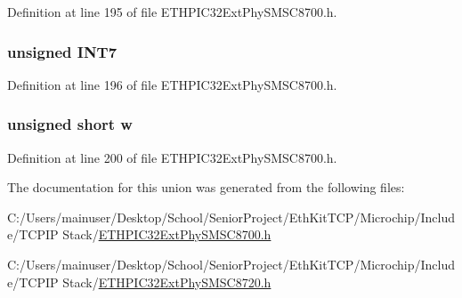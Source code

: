 Definition at line 195 of file E\+T\+H\+P\+I\+C32\+Ext\+Phy\+S\+M\+S\+C8700.\+h.

\hypertarget{union_____i_n_t_m_a_s_kbits__t_ace3cce0f8bc2d246805ad9a8c00ea02e}{}
\subsubsection[{I\+N\+T7}]{\setlength{\rightskip}{0pt plus 5cm}unsigned I\+N\+T7}\label{union_____i_n_t_m_a_s_kbits__t_ace3cce0f8bc2d246805ad9a8c00ea02e}


Definition at line 196 of file E\+T\+H\+P\+I\+C32\+Ext\+Phy\+S\+M\+S\+C8700.\+h.

\hypertarget{union_____i_n_t_m_a_s_kbits__t_a160850a4684a3e82c2323033964f2e98}{}
\subsubsection[{w}]{\setlength{\rightskip}{0pt plus 5cm}unsigned short w}\label{union_____i_n_t_m_a_s_kbits__t_a160850a4684a3e82c2323033964f2e98}


Definition at line 200 of file E\+T\+H\+P\+I\+C32\+Ext\+Phy\+S\+M\+S\+C8700.\+h.



The documentation for this union was generated from the following files\+:\begin{DoxyCompactItemize}
\item 
C\+:/\+Users/mainuser/\+Desktop/\+School/\+Senior\+Project/\+Eth\+Kit\+T\+C\+P/\+Microchip/\+Include/\+T\+C\+P\+I\+P Stack/\hyperlink{_e_t_h_p_i_c32_ext_phy_s_m_s_c8700_8h}{E\+T\+H\+P\+I\+C32\+Ext\+Phy\+S\+M\+S\+C8700.\+h}\item 
C\+:/\+Users/mainuser/\+Desktop/\+School/\+Senior\+Project/\+Eth\+Kit\+T\+C\+P/\+Microchip/\+Include/\+T\+C\+P\+I\+P Stack/\hyperlink{_e_t_h_p_i_c32_ext_phy_s_m_s_c8720_8h}{E\+T\+H\+P\+I\+C32\+Ext\+Phy\+S\+M\+S\+C8720.\+h}\end{DoxyCompactItemize}
